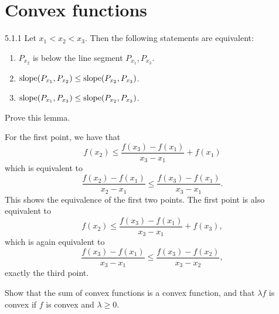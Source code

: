 \section{Convex functions}

\begin{manuallemma}{5.1.1}
  Let $x_1 < x_2 < x_3$.
  Then the following statements are equivalent:
  \begin{enumerate}
    \item $P_{x_2}$ is below the line segment $P_{x_1}, P_{x_3}$.

    \item $\operatorname*{slope}( P_{x_1}, P_{x_2} ) \leq \operatorname*{slope}( P_{x_2}, P_{x_3} )$.

    \item $\operatorname*{slope}( P_{x_1}, P_{x_3} ) \leq \operatorname*{slope}( P_{x_2}, P_{x_3} )$.
  \end{enumerate}
\end{manuallemma}

\begin{exercise}
  Prove this lemma.
\end{exercise}

\begin{solution}
  For the first point, we have that
  \begin{equation}
    f(x_2)
    \leq
    \frac{f(x_3) - f(x_1)}{x_3 - x_1}
    + f(x_1)
  \end{equation}
  which is equivalent to
  \begin{equation}
    \frac{f(x_2) - f(x_1)}{x_2 - x_1}
    \leq
    \frac{f(x_3) - f(x_1)}{x_3 - x_1}.
  \end{equation}
  This shows the equivalence of the first two points.
  The first point is also equivalent to
  \begin{equation}
    f(x_2)
    \leq
    \frac{f(x_3) - f(x_1)}{x_3 - x_1}
    + f(x_3),
  \end{equation}
  which is again equivalent to
  \begin{equation}
    \frac{f(x_3) - f(x_1)}{x_3 - x_1}
    \leq
    \frac{f(x_3) - f(x_2)}{x_3 - x_2},
  \end{equation}
  exactly the third point.
\end{solution}

\begin{exercise}\label{ex:5.2}
  Show that the sum of convex functions is a convex function, and that $\lambda f$ is convex if $f$ is convex and $\lambda \geq 0$.
\end{exercise}

